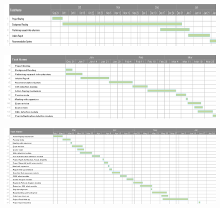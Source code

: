 \begin{figure}[h]
	\centering
	\includegraphics[angle=90]{images/plan6.png}
	\label{fig:test}
\end{figure}

\begin{figure}[h]
	\centering
	\includegraphics[angle=90]{images/plan4.png}
	\label{fig:test}
\end{figure}
\newpage

\begin{figure}[h]
	\centering
	\includegraphics[width=\textheight, angle=90]{images/plan2.png}
	\label{fig:test}
\end{figure}


